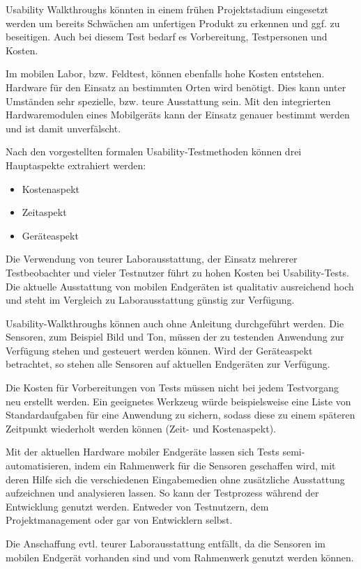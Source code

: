 Usability Walkthroughs könnten in einem frühen Projektstadium eingesetzt werden um bereits Schwächen am unfertigen Produkt zu erkennen und ggf. zu beseitigen. 
Auch bei diesem Test bedarf es Vorbereitung, Testpersonen und Kosten.

Im mobilen Labor, bzw. Feldtest, können ebenfalls hohe Kosten entstehen. 
Hardware für den Einsatz an bestimmten Orten wird benötigt. 
Dies kann unter Umständen sehr spezielle, bzw. teure Ausstattung sein. 
Mit den integrierten Hardwaremodulen eines Mobilgeräts kann der Einsatz genauer bestimmt werden und ist damit unverfälscht.

Nach den vorgestellten formalen Usability-Testmethoden können drei Hauptaspekte extrahiert werden: 
\begin{itemize}
	\item{Kostenaspekt}
	\item{Zeitaspekt}
	\item{Geräteaspekt}
\end{itemize}

Die Verwendung von teurer Laborausstattung, der Einsatz mehrerer Testbeobachter und vieler Testnutzer führt zu hohen Kosten bei Usability-Tests. 
Die aktuelle Ausstattung von mobilen Endgeräten ist qualitativ ausreichend hoch und steht im Vergleich zu Laborausstattung günstig zur Verfügung. 

Usability-Walkthroughs können auch ohne Anleitung durchgeführt werden. 
Die Sensoren, zum Beispiel Bild und Ton, müssen der zu testenden Anwendung zur Verfügung stehen und gesteuert werden können. 
Wird der Geräteaspekt betrachtet, so stehen alle Sensoren auf aktuellen Endgeräten zur Verfügung.

Die Kosten für Vorbereitungen von Tests müssen nicht bei jedem Testvorgang neu erstellt werden. Ein geeignetes Werkzeug würde beispielsweise eine Liste von Standardaufgaben für eine Anwendung zu sichern, sodass diese zu einem späteren Zeitpunkt wiederholt werden können (Zeit- und Kostenaspekt). 

Mit der aktuellen Hardware mobiler Endgeräte lassen sich Tests semi-automatisieren, indem ein Rahmenwerk für die Sensoren geschaffen wird, mit deren Hilfe sich die verschiedenen Eingabemedien ohne zusätzliche Ausstattung aufzeichnen und analysieren lassen. 
So kann der Testprozess während der Entwicklung genutzt werden. 
Entweder von Testnutzern, dem Projektmanagement oder gar von Entwicklern selbst. 

Die Anschaffung evtl. teurer Laborausstattung entfällt, da die Sensoren im mobilen Endgerät vorhanden sind und vom Rahmenwerk genutzt werden können. 

